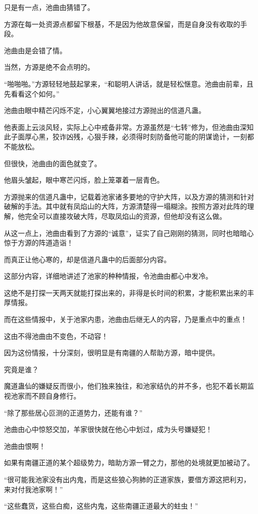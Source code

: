 \begin{this_body}
只是有一点，池曲由猜错了。

方源在每一处资源点都留下根基，不是因为他故意保留，而是自身没有收取的手段。

池曲由是会错了情。

当然，方源是绝不会点明的。

“啪啪啪。”方源轻轻地鼓起掌来，“和聪明人讲话，就是轻松惬意。池曲由前辈，且先看看这个如何。”

池曲由眼中精芒闪烁不定，小心翼翼地接过方源抛出的信道凡蛊。

他表面上云淡风轻，实际上心中戒备非常。方源虽然是“七转”修为，但池曲由深知此子面厚心黑，狡诈凶残，心狠手辣，必须得时刻防备他可能的阴谋诡计，一刻都不能放松。

但很快，池曲由的面色就变了。

他眉头皱起，眼中寒芒闪烁，脸上笼罩着一层青色。

方源抛来的信道凡蛊中，记载着池家诸多要地的守护大阵，以及方源的猜测和针对破解的手法。其中就有凤焰山的大阵，方源清楚得一塌糊涂。按照方源对此阵的理解，他完全可以直接攻破大阵，尽取凤焰山的资源，但他却没有这么做。

从这一点上，池曲由看到了方源的“诚意”，证实了自己刚刚的猜测，同时也暗暗心惊于方源的阵道造诣！

而真正让他心寒的，却是信道凡蛊中的后面部分内容。

这部分内容，详细地讲述了池家的种种情报，令池曲由都心中发冷。

这绝不是打探一天两天就能打探出来的，非得是长时间的积累，才能积累出来的丰厚情报。

而在这些情报中，关于池家内患，池曲由后继无人的内容，乃是重点中的重点！

这由不得池曲由不变色，不动容！

因为这份情报，十分深刻，很明显是有南疆的人帮助方源，暗中提供。

究竟是谁？

魔道蛊仙的嫌疑反而很小，他们独来独往，和池家结仇的并不多，也犯不着长期监视池家而不顾自身修行。

“除了那些居心叵测的正道势力，还能有谁？”

池曲由心中惊怒交加，羊家很快就在他心中划过，成为头号嫌疑犯！

池曲由恨啊！

如果有南疆正道的某个超级势力，暗助方源一臂之力，那他的处境就更加被动了。

“很可能我池家没有出内鬼，而是这些狼心狗肺的正道家族，要借方源这把利刃，来对付我池家啊！”

“这些蠢货，这些白痴，这些内鬼，这些南疆正道最大的蛀虫！”


\end{this_body}
